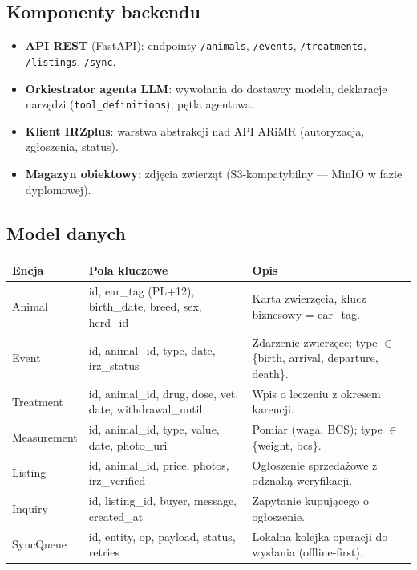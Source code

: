\documentclass[11pt,a4paper]{article}
\begin{document}
\subsection{Komponenty backendu}

\begin{itemize}
  \item \textbf{API REST} (FastAPI): endpointy \texttt{/animals}, \texttt{/events}, \texttt{/treatments}, \texttt{/listings}, \texttt{/sync}.
  \item \textbf{Orkiestrator agenta LLM}: wywołania do dostawcy modelu, deklaracje narzędzi (\texttt{tool\_definitions}), pętla agentowa.
  \item \textbf{Klient IRZplus}: warstwa abstrakcji nad API ARiMR (autoryzacja, zgłoszenia, status).
  \item \textbf{Magazyn obiektowy}: zdjęcia zwierząt (S3-kompatybilny --- MinIO w fazie dyplomowej).
\end{itemize}

\subsection{Model danych}

\begin{longtable}{p{3cm}p{3cm}p{7cm}}
\toprule
\textbf{Encja} & \textbf{Pola kluczowe} & \textbf{Opis} \\
\midrule
\endhead
Animal & id, ear\_tag (PL+12), birth\_date, breed, sex, herd\_id & Karta zwierzęcia, klucz biznesowy = ear\_tag. \\
Event & id, animal\_id, type, date, irz\_status & Zdarzenie zwierzęce; type $\in$ \{birth, arrival, departure, death\}. \\
Treatment & id, animal\_id, drug, dose, vet, date, withdrawal\_until & Wpis o leczeniu z okresem karencji. \\
Measurement & id, animal\_id, type, value, date, photo\_uri & Pomiar (waga, BCS); type $\in$ \{weight, bcs\}. \\
Listing & id, animal\_id, price, photos, irz\_verified & Ogłoszenie sprzedażowe z odznaką weryfikacji. \\
Inquiry & id, listing\_id, buyer, message, created\_at & Zapytanie kupującego o ogłoszenie. \\
SyncQueue & id, entity, op, payload, status, retries & Lokalna kolejka operacji do wysłania (offline-first). \\
\bottomrule
\end{longtable}
\end{document}
